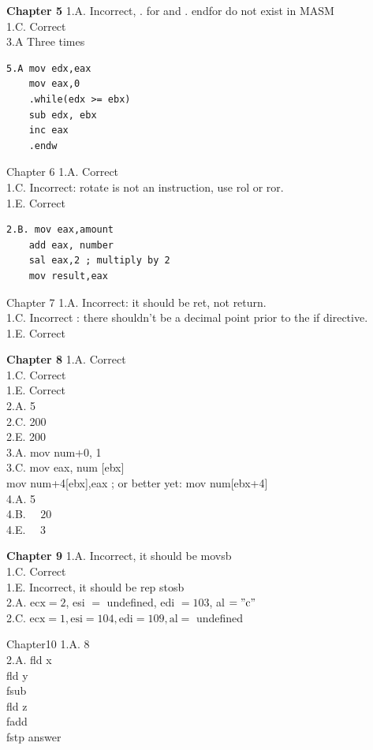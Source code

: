\documentclass[10pt]{book}
\begin{document}
\textbf{Chapter 5}
1.A. Incorrect, . for and . endfor do not exist in MASM\\
1.C. Correct\\
3.A Three times

\begin{verbatim}
5.A mov edx,eax
    mov eax,0
    .while(edx >= ebx)
    sub edx, ebx
    inc eax
    .endw
\end{verbatim}

Chapter 6
1.A. Correct\\
1.C. Incorrect: rotate is not an instruction, use rol or ror.\\
1.E. Correct

\begin{verbatim}
2.B. mov eax,amount
    add eax, number
    sal eax,2 ; multiply by 2
    mov result,eax
\end{verbatim}

Chapter 7
1.A. Incorrect: it should be ret, not return.\\
1.C. Incorrect : there shouldn't be a decimal point prior to the if directive.\\
1.E. Correct

\textbf{Chapter 8}
1.A. Correct\\
1.C. Correct\\
1.E. Correct\\
2.A. 5\\
2.C. 200\\
2.E. 200\\
3.A. mov num+0, 1\\[0pt]
3.C. mov eax, num [ebx]\\[0pt]
mov num+4[ebx],eax ; or better yet: mov num[ebx+4]\\
4.A. 5\\
4.B. $\quad 20$\\
4.E. $\quad 3$

\textbf{Chapter 9}
1.A. Incorrect, it should be movsb\\
1.C. Correct\\
1.E. Incorrect, it should be rep stosb\\
2.A. $\mathrm{ecx}=2$, esi $=$ undefined, edi $=103$, al $=" \mathrm{c} "$\\
2.C. $\mathrm{ecx}=1, \mathrm{esi}=104, \mathrm{edi}=109, \mathrm{al}=$ undefined

Chapter10
1.A. 8\\
2.A. fld x\\
fld y\\
fsub\\
fld z\\
fadd\\
fstp answer
\end{document}
